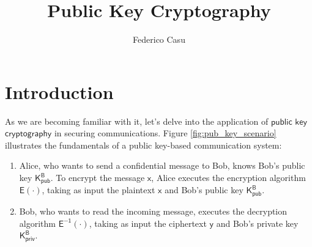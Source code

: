 \documentclass{article}
\title{Public Key Cryptography}
\author{Federico Casu}
\begin{document}
\maketitle


\section{Introduction}
As we are becoming familiar with it, let's delve into the application of $\mathsf{public}$ $\mathsf{key}$ $\mathsf{cryptography}$ in securing communications. Figure \ref{fig:pub_key_scenario} illustrates the fundamentals of a public key-based communication system:

\begin{enumerate}
    \item Alice, who wants to send a confidential message to Bob, knows Bob's public key $\mathsf{K_{pub}^{B}}$. To encrypt the message $\mathsf{x}$, Alice executes the encryption algorithm $\mathsf{E(\cdot)}$, taking as input the plaintext $\mathsf{x}$ and Bob's public key $\mathsf{K_{pub}^{B}}$.
    \item Bob, who wants to read the incoming message, executes the decryption algorithm $\mathsf{E^{-1}(\cdot)}$, taking as input the ciphertext $\mathsf{y}$ and Bob's private key $\mathsf{K_{priv}^{B}}$.
\end{enumerate}
\end{document}
